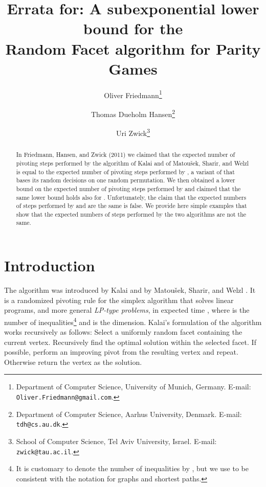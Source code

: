 \documentclass[twoside,11pt]{article}
\begin{document}
\title{\textbf{Errata for:} A subexponential lower bound for the \\Random Facet algorithm for Parity Games}

\author{Oliver Friedmann\thanks{Department of Computer Science,
University of Munich, Germany. E-mail: {\tt
  Oliver.Friedmann@gmail.com}.}\\
 \and
Thomas Dueholm Hansen\thanks{Department of Computer Science,
Aarhus University, Denmark. E-mail:
{\tt tdh@cs.au.dk}.}\\
\and
Uri Zwick\thanks{School of Computer Science, Tel Aviv University,
  Israel. E-mail: {\tt zwick@tau.ac.il}.} }
\date{}

\maketitle

\begin{abstract}\noindent In Friedmann, Hansen, and Zwick (2011) we claimed that the expected number of pivoting steps performed by the  algorithm of Kalai and of Matou{\v{s}}ek, Sharir, and Welzl is equal to the expected number of pivoting steps performed by , a variant of  that bases its random decisions on one random permutation. We then obtained a lower bound on the expected number of pivoting steps performed by  and claimed that the same lower bound holds also for .
Unfortunately, the claim that the expected numbers of steps performed by  and  are the same is false. We provide here simple examples that show that the expected numbers of steps performed by the two algorithms are not the same.
\end{abstract}

\section{Introduction}

The  algorithm was introduced by Kalai \cite{Kalai92,Kalai97} and by Matou{\v{s}}ek, Sharir, and Welzl \cite{MaShWe96}. It is a randomized pivoting rule for the simplex algorithm that solves linear programs, and more general \emph{LP-type problems}, in expected time , where  is the number of inequalities\footnote{It is customary to denote the number of inequalities by , but we use  to be consistent with the notation for graphs and shortest paths.} and  is the dimension. Kalai's formulation of the algorithm works recursively as follows: Select a uniformly random facet containing the current vertex. Recursively find the optimal solution within the selected facet. If possible, perform an improving pivot from the resulting vertex and repeat. Otherwise return the vertex as the solution.
\end{document}
